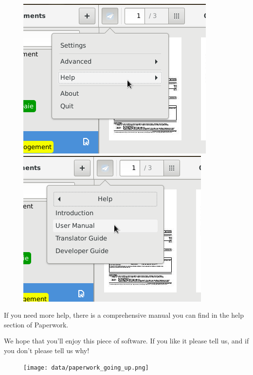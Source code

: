 \documentclass[10pt,a4paper]{article}
\begin{document}
\begin{figure}[H]
	\centering
	\includegraphics[scale=0.33]{data/menu_help.png}
	\includegraphics[scale=0.33]{data/menu_help_user_manual.png}
\end{figure}

If you need more help, there is a comprehensive manual you can find in the help
section of Paperwork.

We hope that you'll enjoy this piece of software. If you like it please tell
us, and if you don't please tell us why!

\begin{figure}[b]
	\texttt{[image: data/paperwork\_going\_up.png]}
\end{figure}
\end{document}
